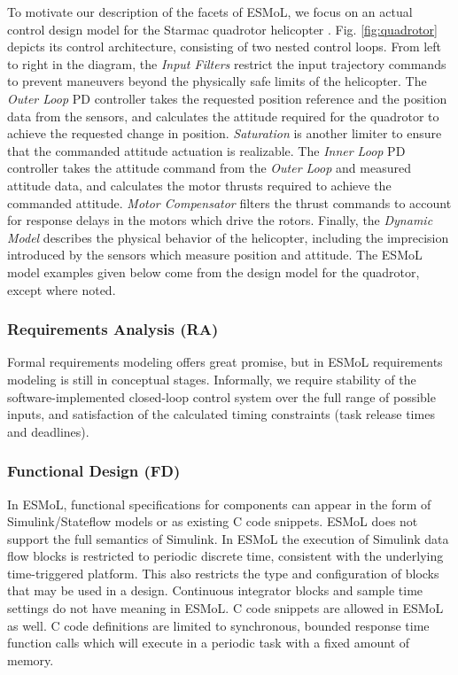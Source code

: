 To motivate our description of the facets of ESMoL, we focus on an 
actual control design model for the Starmac quadrotor helicopter 
\cite{quad:starmac}\cite{quad:starmacdyn}.  Fig. \ref{fig:quadrotor}
depicts its control architecture, consisting of two nested control loops.
From left to right in the diagram, the \emph{Input Filters} restrict
the input trajectory commands to prevent maneuvers beyond the physically
safe limits of the helicopter.  The \emph{Outer Loop} PD controller 
takes the requested position reference and the position data from the 
sensors, and calculates the attitude required for the quadrotor to
achieve the requested change in position.  \emph{Saturation} is another
limiter to ensure that the commanded attitude actuation is realizable.
The \emph{Inner Loop} PD controller takes the attitude command from
the \emph{Outer Loop} and measured attitude data, and calculates 
the motor thrusts required to achieve the commanded attitude.
\emph{Motor Compensator} filters the thrust commands to account for 
response delays in the motors which drive the rotors.  Finally, the 
\emph{Dynamic Model} describes the physical behavior of the helicopter,
including the imprecision introduced by the sensors which measure
position and attitude.
The ESMoL model examples given below come from the design model for
the quadrotor, except where noted.

\subsubsection*{Requirements Analysis (RA)}

Formal requirements modeling offers great promise, 
but in ESMoL requirements modeling is still in conceptual stages.  
Informally, we require stability of the software-implemented 
closed-loop control system 
over the full range of possible inputs, and satisfaction of the
calculated timing constraints (task release times and deadlines).

\subsubsection*{Functional Design (FD)}

In ESMoL, functional specifications for components 
can appear in the form of Simulink/Stateflow models or 
as existing C code snippets.  ESMoL does not support 
the full semantics of Simulink. In ESMoL the execution 
of Simulink data flow blocks is restricted to periodic 
discrete time, consistent with the underlying 
time-triggered platform.  This also restricts the type 
and configuration of blocks that may be used in a 
design.  Continuous integrator blocks and sample time 
settings do not have meaning in ESMoL.  C code snippets 
are allowed in ESMoL as well.  C code definitions are 
limited to synchronous, bounded response time function 
calls which will execute in a periodic task with a fixed
amount of memory.

